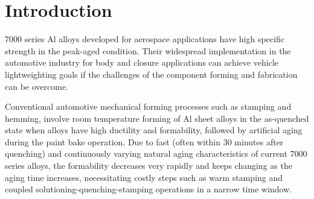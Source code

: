 \section{Introduction}
\label{Chap:Al/Vac:section:Intro}

7000 series Al alloys developed for aerospace applications have high specific strength in the peak-aged condition. Their widespread implementation in the automotive industry for body and closure applications can achieve vehicle lightweighting goals if the challenges of the component forming and fabrication can be overcome. 

Conventional automotive mechanical forming processes such as stamping and hemming, involve room temperature forming of Al sheet alloys in the as-quenched state when alloys have high ductility and formability, followed by artificial aging during the paint bake operation. Due to fast (often within 30 minutes after quenching) and continuously varying natural aging characteristics of current 7000 series alloys, the formability decreases very rapidly and keeps changing as the aging time increases, necessitating costly steps such as warm stamping and coupled solutioning-quenching-stamping operations in a narrow time window.

